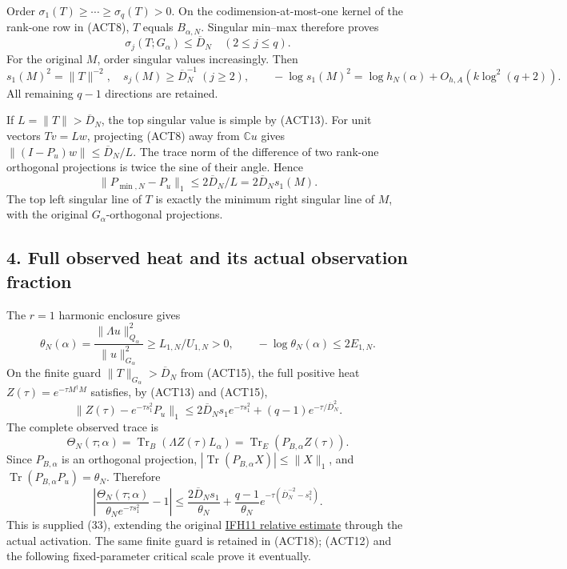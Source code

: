 \documentclass[11pt]{article}
\begin{document}
Order \(\sigma_1(T)\ge\cdots\ge\sigma_q(T)>0\). On the codimension-at-most-one kernel of the rank-one row in (ACT8), \(T\) equals \(B_{\alpha,N}\). Singular min--max therefore proves \[
\sigma_j(T;G_\alpha)\le\overline D_N\quad(2\le j\le q).
\tag{ACT13}
\] For the original \(M\), order singular values increasingly. Then \[
s_1(M)^2=\|T\|^{-2},\quad s_j(M)\ge\overline D_N^{-1}\ (j\ge2),\qquad
-\log s_1(M)^2=\log h_N(\alpha)+O_{h,A}(k\log^2(q+2)).
\tag{ACT14}
\] All remaining \(q-1\) directions are retained.

If \(L=\|T\|>\overline D_N\), the top singular value is simple by (ACT13). For unit vectors \(Tv=Lw\), projecting (ACT8) away from \(\mathbb Cu\) gives \(\|(I-P_u)w\|\le\overline D_N/L\). The trace norm of the difference of two rank-one orthogonal projections is twice the sine of their angle. Hence \[
\|P_{\min,N}-P_u\|_1\le2\overline D_N/L=2\overline D_Ns_1(M).
\tag{ACT15}
\] The top left singular line of \(T\) is exactly the minimum right singular line of \(M\), with the original \(G_\alpha\)-orthogonal projections.

\subsection{4. Full observed heat and its actual observation fraction}\label{full-observed-heat-and-its-actual-observation-fraction}

The \(r=1\) harmonic enclosure gives \[
\theta_N(\alpha)=\frac{\|\Lambda u\|_{Q_\alpha}^2}{\|u\|_{G_\alpha}^2}
\ge L_{1,N}/U_{1,N}>0,\qquad -\log\theta_N(\alpha)\le2E_{1,N}.
\tag{ACT16}
\] On the finite guard \(\|T\|_{G_\alpha}>\overline D_N\) from (ACT15), the full positive heat \(Z(\tau)=e^{-\tau M^\dagger M}\) satisfies, by (ACT13) and (ACT15), \[
\|Z(\tau)-e^{-\tau s_1^2}P_u\|_1
\le2\overline D_Ns_1e^{-\tau s_1^2}+(q-1)e^{-\tau/\overline D_N^2}.
\tag{ACT17}
\] The complete observed trace is \[
\Theta_N(\tau;\alpha)=\operatorname{Tr}_B(\Lambda Z(\tau)L_\alpha)
=\operatorname{Tr}_E(P_{B,\alpha}Z(\tau)).
\] Since \(P_{B,\alpha}\) is an orthogonal projection, \(|\operatorname{Tr}(P_{B,\alpha}X)|\le\|X\|_1\), and \(\operatorname{Tr}(P_{B,\alpha}P_u)=\theta_N\). Therefore \[
\left|\frac{\Theta_N(\tau;\alpha)}{\theta_Ne^{-\tau s_1^2}}-1\right|
\le\frac{2\overline D_Ns_1}{\theta_N}
+\frac{q-1}{\theta_N}e^{-\tau(\overline D_N^{-2}-s_1^2)}.
\tag{ACT18}
\] This is supplied (33), extending the original \href{https://github.com/KokunoYumeto/zeta-function-research-reader/blob/edd4008690952fb8568a01744e49ad7e180401e9/workbenches/splitzero-tandem/continuations/20260921-original-observation/INVERSE_FLAG_AND_RELATIVE_HEAT.tex\#L200}{IFH11 relative estimate} through the actual activation. The same finite guard is retained in (ACT18); (ACT12) and the following fixed-parameter critical scale prove it eventually.
\end{document}
